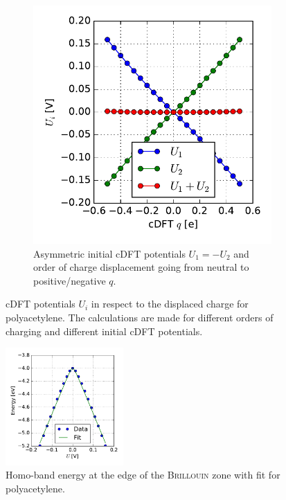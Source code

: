 \begin{figure}
\begin{subfigure}{0.45\textwidth}
	\includegraphics[width = \textwidth]{Images/polyacetylene/charging/potential_q_1}
	\caption{Asymmetric initial cDFT potentials $U_1 = -U_2$ and order of charge displacement going from neutral to  positive/negative $q$.}
	\label{}
	\end{subfigure}
	\caption{cDFT potentials $U_i$ in respect to the displaced charge for polyacetylene. The calculations are made for different orders of charging and different initial cDFT potentials.}
	\label{image_polyacetylene_potentials_asymmetry}
\end{figure}
\begin{figure}
	\centering
	\includegraphics[width = 0.4\textwidth]{Images/polyacetylene/charging/border_energy_q_1}
	\caption{Homo-band energy at the edge of the \textsc{Brillouin} zone with fit for polyacetylene.}
	\label{image_border_energy_polyacetylene}
\end{figure}
